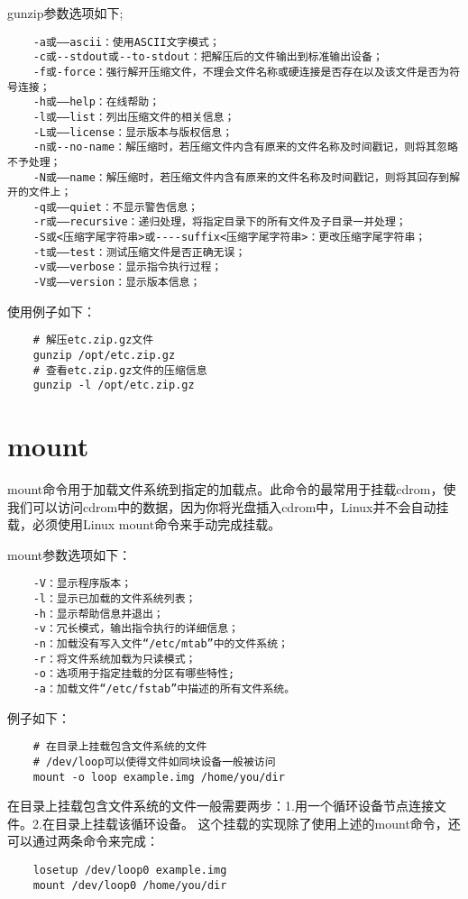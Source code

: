 \documentclass[a4paper,left=2.5cm,right=2.5cm,11pt]{article}
\begin{document}
	gunzip参数选项如下;
	\begin{lstlisting}
	-a或——ascii：使用ASCII文字模式； 
	-c或--stdout或--to-stdout：把解压后的文件输出到标准输出设备； 
	-f或-force：强行解开压缩文件，不理会文件名称或硬连接是否存在以及该文件是否为符号连接； 
	-h或——help：在线帮助； 
	-l或——list：列出压缩文件的相关信息； 
	-L或——license：显示版本与版权信息； 
	-n或--no-name：解压缩时，若压缩文件内含有原来的文件名称及时间戳记，则将其忽略不予处理； 
	-N或——name：解压缩时，若压缩文件内含有原来的文件名称及时间戳记，则将其回存到解开的文件上； 
	-q或——quiet：不显示警告信息； 
	-r或——recursive：递归处理，将指定目录下的所有文件及子目录一并处理； 
	-S或<压缩字尾字符串>或----suffix<压缩字尾字符串>：更改压缩字尾字符串； 
	-t或——test：测试压缩文件是否正确无误； 
	-v或——verbose：显示指令执行过程； 
	-V或——version：显示版本信息；
	\end{lstlisting}

	使用例子如下：
	\begin{lstlisting}
	# 解压etc.zip.gz文件
	gunzip /opt/etc.zip.gz
	# 查看etc.zip.gz文件的压缩信息
	gunzip -l /opt/etc.zip.gz
	\end{lstlisting}

\section{mount}
	mount命令用于加载文件系统到指定的加载点。此命令的最常用于挂载cdrom，使我们可以访问cdrom中的数据，因为你将光盘插入cdrom中，Linux并不会自动挂载，必须使用Linux mount命令来手动完成挂载。\par

	mount参数选项如下：
	\begin{lstlisting}
	-V：显示程序版本； 
	-l：显示已加载的文件系统列表； 
	-h：显示帮助信息并退出； 
	-v：冗长模式，输出指令执行的详细信息； 
	-n：加载没有写入文件“/etc/mtab”中的文件系统； 
	-r：将文件系统加载为只读模式； 
	-o：选项用于指定挂载的分区有哪些特性;
	-a：加载文件“/etc/fstab”中描述的所有文件系统。
	\end{lstlisting}

	例子如下：
	\begin{lstlisting}
	# 在目录上挂载包含文件系统的文件
	# /dev/loop可以使得文件如同块设备一般被访问
	mount -o loop example.img /home/you/dir
	\end{lstlisting}

	在目录上挂载包含文件系统的文件一般需要两步：1.用一个循环设备节点连接文件。2.在目录上挂载该循环设备。
	这个挂载的实现除了使用上述的mount命令，还可以通过两条命令来完成：
	\begin{lstlisting}
	losetup /dev/loop0 example.img
	mount /dev/loop0 /home/you/dir
	\end{lstlisting}
\end{document}

